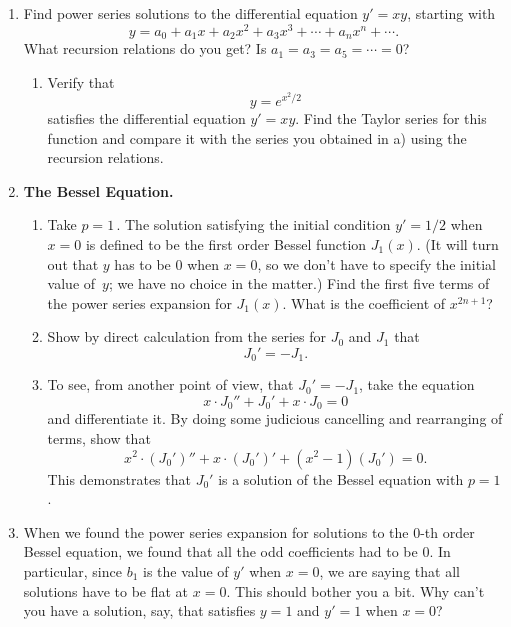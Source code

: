 \begin{enumerate}
\begin{enumerate}
\end{enumerate}
\item Find power series solutions to the differential equation
$y'=xy$, starting with
\[
y = a_0 + a_1x + a_2 x^2 + a_3 x^3 + \cdots + a_n x^n + \cdots .
\]
What recursion relations do you get?  Is $a_1 = a_3 = a_5 = \cdots =
0$?

  \begin{enumerate}
  \item Verify that
\[
y = e^{x^2/2}
\]
satisfies the differential equation $y'=xy$.  Find the Taylor series
for this function and compare it with the series you obtained in a)
using the recursion relations.


\end{enumerate}
\item {\bf The Bessel Equation.}


  \begin{enumerate}
  \item Take $p=1\,$.  The solution satisfying the initial condition $y'
=1/2$ when $x=0$ is defined to be the first order Bessel function
$J_1(x)$. (It will turn out that $y$ has
to be 0 when $x=0$, so we don't have to specify the initial value
of~$y$; we have no choice in the matter.) Find the first five terms of
the power series expansion for $J_1(x)$.  What is the coefficient of
$x^{2n+1}$?

  \item Show by direct calculation from the series for $J_0$ and $J_1$
that
\[
J_0' = - J_1.
\]


  \item To see, from another point of view, that $J_0' = -
J_1$, take
the equation
\[
x \cdot J_0'' + J_0' + x \cdot J_0 = 0
\]
and differentiate it.  By doing some judicious cancelling and
rearranging of terms, show that
\[
x^2 \cdot (J_0')'' + x \cdot (J_0')' + (x^2 -1)(J_0') = 0.
\]
This demonstrates that $J_0'$ is a solution of the Bessel equation
with $p=1$.


\end{enumerate}
\item When we found the power series expansion for solutions to the
0-th order Bessel equation, we found that all the odd coefficients had
to be 0.  In particular, since $b_1$ is the value of $y'$ when $x=0$,
we are saying that all solutions have to be flat at $x=0$.  This
should bother you a bit.  Why can't you have a solution, say, that
satisfies $y=1$ and $y'=1$ when $x=0$?


\end{enumerate}
